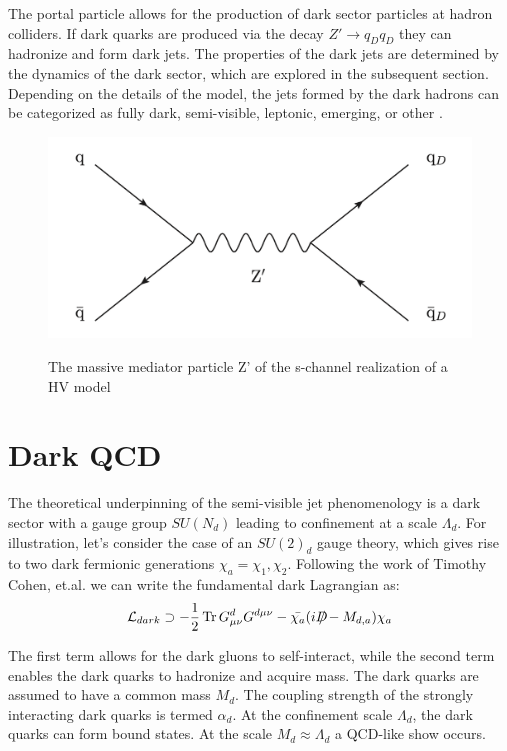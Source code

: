 The portal particle allows for the production of dark sector particles at hadron colliders. If dark quarks are produced via the decay $Z' \rightarrow q_D q_D$ they can hadronize and form dark jets. The properties of the dark jets are determined by the dynamics of the dark sector, which are explored in the subsequent section. Depending on the details of the model, the jets formed by the dark hadrons can be categorized as fully dark, semi-visible, leptonic, emerging, or other \cite{snowmass}. \par

\begin{figure}[h]
        \centering
	\includegraphics[width=.5\textwidth]{figures/ch2/zprime_feynman_diagram.png}
        \label{fig:ch2/zprime_feynman_diagram.png}
        \caption{The massive mediator particle Z' of the s-channel realization of a HV model}
\end{figure}

\section{Dark QCD}
\label{sec:darkqcd}
The theoretical underpinning of the semi-visible jet phenomenology is a dark sector with a gauge group $SU(N_d)$ leading to confinement at a scale $\Lambda_d$. For illustration, let's consider the case of an $SU(2)_d$ gauge theory, which gives rise to two dark fermionic generations $\chi_a = \chi_1, \chi_2$. Following the work of Timothy Cohen, et.al. we can write the fundamental dark Lagrangian as:
\begin{equation}
	\mathcal{L}_{dark} \supset - \frac{1}{2} \Tr G^{d}_{\mu\nu} G^{d\mu\nu} - \bar{\chi_a} (i {D\mkern-11.5mu/}-M_{d,a}) \chi_a
\end{equation}

The first term allows for the dark gluons to self-interact, while the second term enables the dark quarks to hadronize and acquire mass. The dark quarks are assumed to have a common mass $M_d$. The coupling strength of the strongly interacting dark quarks is termed $\alpha_d$. At the confinement scale $\Lambda_d$, the dark quarks can form bound states. At the scale $M_d \approx \Lambda_d$ a QCD-like show occurs. \par 

